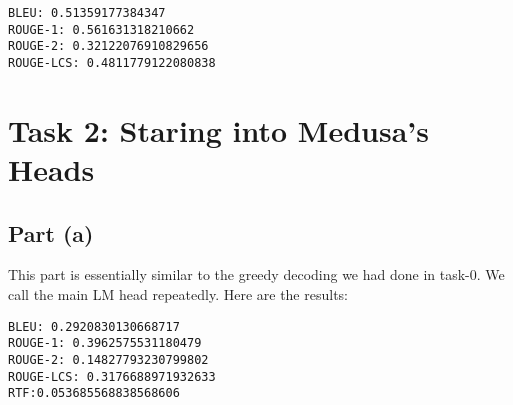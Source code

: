 \documentclass[a4paper,12pt]{article}
\begin{document}
\begin{verbatim}
BLEU: 0.51359177384347
ROUGE-1: 0.561631318210662
ROUGE-2: 0.32122076910829656
ROUGE-LCS: 0.4811779122080838
\end{verbatim}

\section{Task 2: Staring into Medusa's Heads}

\subsection{Part (a)}
This part is essentially similar to the greedy decoding we had done in task-0. We call the main LM head repeatedly. Here are the results:

\begin{verbatim}
BLEU: 0.2920830130668717
ROUGE-1: 0.3962575531180479
ROUGE-2: 0.14827793230799802
ROUGE-LCS: 0.3176688971932633
RTF:0.053685568838568606
\end{verbatim}
\end{document}
